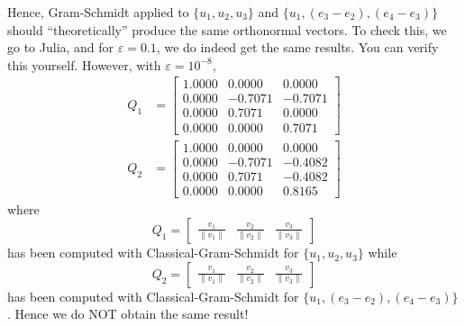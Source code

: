 \begin{tcolorbox}
Hence, Gram-Schmidt applied to $\{u_1,u_2,u_3\}$ and $\{u_1,(e_3-e_2),(e_4-e_3)\}$ should ``theoretically'' produce the same orthonormal vectors. To check this, we go to Julia, and for $\varepsilon=0.1$, we do indeed get the same results. You can verify this yourself. However, with $\varepsilon=10^{-8}$,
\begin{align*}
    Q_1 &= \left[ \begin{array}{rrr}
  1.0000     &    0.0000     &  0.0000  \\
    0.0000 &  -0.7071  & -0.7071 \\
        0.0000  &   0.7071   &      0.0000  \\
        0.0000   &      0.0000  &  0.7071
    \end{array} \right] \\
    Q_2&=\left[ \begin{array}{rrr}
  1.0000     &    0.0000     &  0.0000  \\
    0.0000 &  -0.7071  & -0.4082 \\
        0.0000  &   0.7071   &      -0.4082  \\
        0.0000   &      0.0000  &  0.8165
    \end{array} \right] 
    \end{align*}
where $$Q_1=\begin{bmatrix} \frac{v_1}{\| v_1 \|} & \frac{v_2}{\| v_2 \|} & \frac{v_3}{\| v_3 \|}\end{bmatrix}$$
has been computed with Classical-Gram-Schmidt for $\{u_1,u_2,u_3\}$ while $$Q_2=\begin{bmatrix} \frac{v_1}{\| v_1 \|} & \frac{v_2}{\| v_2 \|} & \frac{v_3}{\| v_3 \|}\end{bmatrix}$$
has been computed with Classical-Gram-Schmidt for $\{u_1,(e_3-e_2),(e_4-e_3)\}$. Hence we do NOT obtain the same result!
\end{tcolorbox}



